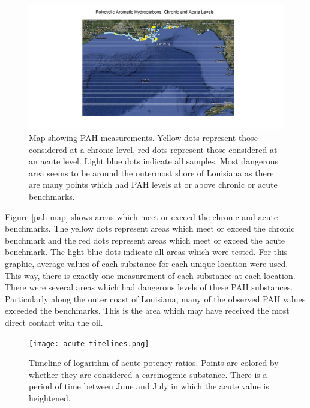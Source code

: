 \documentclass[11pt]{article}
\begin{document}
\begin{figure}[htbp] %
   \centering
   \includegraphics[width=5in]{chron-acute-map.png} 
   \caption{Map showing PAH measurements. Yellow dots represent those considered at a chronic level, red dots represent those considered at an acute level.  Light blue dots indicate all samples.  Most dangerous area seems to be around the outermost shore of Louisiana as there are many points which had PAH levels at or above chronic or acute benchmarks.}
   \label{pah-map }
\end{figure}


Figure \ref{pah-map} shows areas which meet or exceed the chronic and acute benchmarks.  The yellow dots represent areas which meet or exceed the chronic benchmark and the red dots represent areas which meet or exceed the acute benchmark.  The light blue dots indicate all areas which were tested.  For this graphic, average values of each substance for each unique location were used.  This way, there is exactly one measurement of each substance at each location.  There were several areas which had dangerous levels of these PAH substances.  Particularly along the outer coast of Louisiana, many of the observed PAH values exceeded the benchmarks.  This is the area which may have received the most direct contact with the oil.  

\begin{figure}[htbp] %
   \centering
   \texttt{[image: acute-timelines.png]} 
   \caption{Timeline of logarithm of acute potency ratios.  Points are colored by whether they are considered a carcinogenic substance. There is a period of time between June and July in which the acute value is heightened.}
   \label{pah-timeline}
\end{figure}
\end{document}
